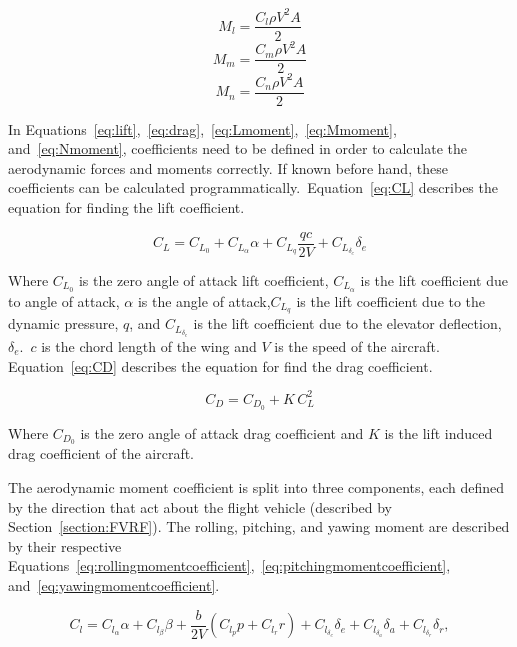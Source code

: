 \begin{equation}\label{eq:Lmoment}
    M_l = \frac{C_l \rho V^2 A}{2}
\end{equation}
\begin{equation}\label{eq:Mmoment}
    M_m = \frac{C_m \rho V^2 A}{2}
\end{equation}
\begin{equation}\label{eq:Nmoment}
    M_n = \frac{C_n \rho V^2 A}{2}
\end{equation}

In Equations~\ref{eq:lift},~\ref{eq:drag},~\ref{eq:Lmoment},~\ref{eq:Mmoment}, and~\ref{eq:Nmoment}, coefficients need to be defined in order to calculate the aerodynamic forces and moments correctly. If known before hand, these coefficients can be calculated programmatically.~Equation~\ref{eq:CL} describes the equation for finding the lift coefficient.

\begin{equation}\label{eq:CL}
    C_L = C_{L_0} + C_{L_\alpha}\alpha + C_{L_q}\frac{qc}{2V} + C_{L_{\delta_e}}\delta_e
\end{equation}

Where \(C_{L_0}\) is the zero angle of attack lift coefficient, \(C_{L_\alpha}\) is the lift coefficient due to angle of attack, \(\alpha \) is the angle of attack,\(C_{L_q}\) is the lift coefficient due to the dynamic pressure, \(q\), and \(C_{L_{\delta_e}}\) is the lift coefficient due to the elevator deflection, \(\delta_e\).~\(c\) is the chord length of the wing and \(V\) is the speed of the aircraft. Equation~\ref{eq:CD} describes the equation for find the drag coefficient.

\begin{equation}\label{eq:CD}
    C_D = C_{D_0} + K\,C_{L}^2
\end{equation}

Where \(C_{D_0}\) is the zero angle of attack drag coefficient and \(K\) is the lift induced drag coefficient of the aircraft.

The aerodynamic moment coefficient is split into three components, each defined by the direction that act about the flight vehicle (described by Section~\ref{section:FVRF}). The rolling, pitching, and yawing moment are described by their respective Equations~\ref{eq:rollingmomentcoefficient},~\ref{eq:pitchingmomentcoefficient}, and~\ref{eq:yawingmomentcoefficient}.

\begin{equation}\label{eq:rollingmomentcoefficient}
    C_l = C_{l_\alpha}\alpha + C_{l_\beta}\beta + \frac{b}{2V}\left(C_{l_p}p + C_{l_r}r\right) + C_{l_{\delta_e}}\delta_e + C_{l_{\delta_a}}\delta_a + C_{l_{\delta_r}}\delta_r,
\end{equation}

